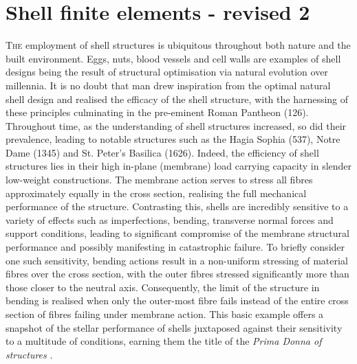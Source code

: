



\chapter{Shell finite elements - revised 2}
\label{chap:chapter_2}

\renewcommand{\Thema}{Shell finite elements}

\lettrine[lines=2]{T}{he} employment of shell structures is ubiquitous throughout both nature and the built environment. Eggs, nuts, blood vessels and cell walls are examples of shell designs being the result of structural optimisation via natural evolution over millennia. It is no doubt that man drew inspiration from the optimal natural shell design and realised the efficacy of the shell structure, with the harnessing of these principles culminating in the pre-eminent Roman Pantheon (126).  Throughout time, as the understanding of shell structures increased, so did their prevalence, leading to notable structures such as the Hagia Sophia (537), Notre Dame (1345) and St. Peter's Basilica (1626). Indeed, the efficiency of shell structures lies in their high in-plane (membrane) load carrying capacity in slender low-weight constructions. The membrane action serves to stress all fibres approximately equally in the cross section, realising the full mechanical performance of the structure. Contrasting this, shells are incredibly sensitive to a variety of effects such as imperfections, bending, transverse normal forces and support conditions, leading to significant compromise of the membrane structural performance and possibly manifesting in catastrophic failure. To briefly consider one such sensitivity, bending actions result in a non-uniform stressing of material fibres over the cross section, with the outer fibres stressed significantly more than those closer to the neutral axis. Consequently, the limit of the structure in bending is realised when only the outer-most fibre fails instead of the entire cross section of fibres failing under membrane action. This basic example offers a snapshot of the stellar performance of shells juxtaposed against their sensitivity to a multitude of conditions, earning them the title of the \textit{Prima Donna of structures} \cite{Ram16}.


